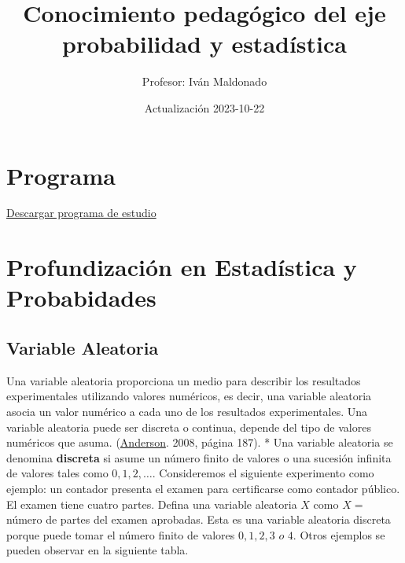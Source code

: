 \documentclass[
]{book}
\title{Conocimiento pedagógico del eje probabilidad y estadística}
\author{Profesor: Iván Maldonado}
\date{Actualización 2023-10-22}
\begin{document}
\maketitle

{
\setcounter{tocdepth}{1}
\tableofcontents
}
\hypertarget{programa}{%
\chapter*{Programa}\label{programa}}

\href{https://correouss-my.sharepoint.com/:b:/g/personal/imaldonadoc1_docente_uss_cl/EXfiKuJSO7JCle9L_86S0EMBeDkr3OyYHprvy0Rc0Jj4mQ?e=JcPOWy}{Descargar programa de estudio}

\hypertarget{profundizaciuxf3n-en-estaduxedstica-y-probabidades}{%
\chapter{Profundización en Estadística y Probabidades}\label{profundizaciuxf3n-en-estaduxedstica-y-probabidades}}

\hypertarget{variable-aleatoria}{%
\section{Variable Aleatoria}\label{variable-aleatoria}}

Una variable aleatoria proporciona un medio para describir los resultados experimentales utilizando valores numéricos, es decir, una variable aleatoria asocia un valor numérico a cada uno de los resultados experimentales. Una variable aleatoria puede ser discreta o continua, depende del tipo de valores numéricos que asuma. (\protect\hyperlink{ux5cux2520Referencias}{Anderson}. 2008, página 187).
* Una variable aleatoria se denomina \textbf{discreta} si asume un número finito de valores o una sucesión infinita de valores tales como \(0,1,2,\ldots\). Consideremos el siguiente experimento como ejemplo: un contador presenta el examen para certificarse como contador público. El examen tiene cuatro partes. Defina una variable aleatoria \(X\) como \(X =\) número de partes del examen aprobadas. Esta es una variable aleatoria discreta porque puede tomar el número finito de valores \(0,1,2,3\,\,o \,\, 4\).
Otros ejemplos se pueden observar en la siguiente tabla.
\end{document}
